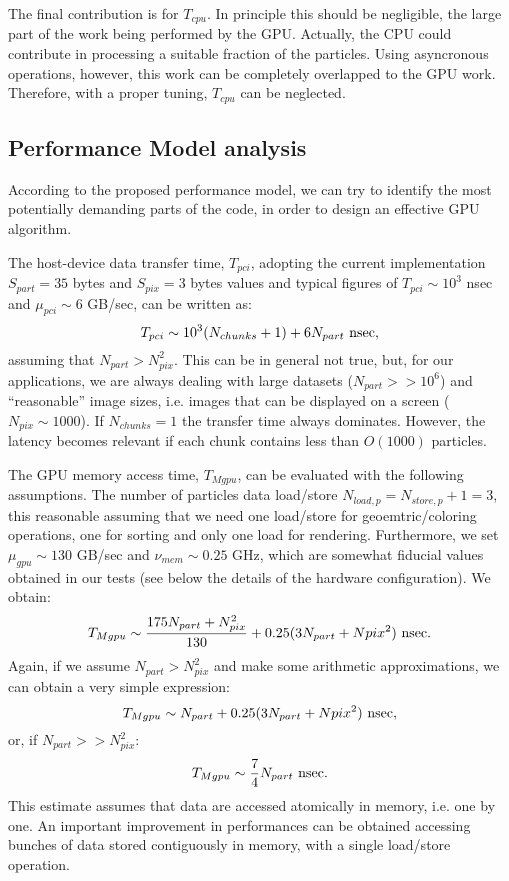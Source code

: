 \documentclass[11pt]{article}
\begin{document}
The final contribution is for $T_{cpu}$. In principle this should be negligible, 
the large part of the work being performed by the GPU. Actually, the CPU
could contribute in processing a suitable fraction of the particles. Using
asyncronous operations, however, this work can be completely overlapped 
to the GPU work. Therefore, with a proper tuning, $T_{cpu}$ can be neglected.

\subsection{Performance Model analysis}

According to the proposed performance model, we can try to identify the most 
potentially demanding parts of the code, in order to design an 
effective GPU algorithm.

The host-device data transfer time, $T_{pci}$, adopting the current implementation 
$S_{part} = 35$ bytes and $S_{pix} = 3$ bytes values and typical figures of 
$T_{pci} \sim 10^3$ nsec and $\mu_{pci} \sim 6$ GB/sec, can be written as:
\begin{equation}
T_{pci} \sim 10^3(N_{chunks} + 1) + 6 N_{part}\ {\rm nsec},
\end{equation}
assuming that $N_{part} > N_{pix}^2$. This can be in general not true, but, 
for our applications, we are always dealing with large datasets
($N_{part} >> 10^6$) and ``reasonable'' image sizes, i.e. images that can be 
displayed on a screen ($N_{pix} \sim 1000$). If $N_{chunks} = 1$ the transfer 
time always dominates. However, the latency becomes relevant if each
chunk contains less than $O(1000)$ particles. 

The GPU memory access time, $T_{Mgpu}$, can be evaluated with the 
following assumptions. The number of particles data load/store $N_{load,p} = 
N_{store,p}+1 = 3$, this reasonable assuming that we need one load/store
for geoemtric/coloring operations, one for sorting and only one load
for rendering. Furthermore, we 
set $\mu_{gpu} \sim 130$ GB/sec and $\nu_{mem} \sim 0.25$ GHz, which are somewhat
fiducial values obtained in our tests (see below the details of the 
hardware configuration). We obtain:
\begin{equation}
T_{Mgpu} \sim {175 N_{part} + N_{pix}^2\over 130} + 0.25 (3 N_{part} + N{pix}^2)\ {\rm nsec}.
\end{equation}
Again, if we assume $N_{part} > N_{pix}^2$ and make some arithmetic approximations,
we can obtain a very simple expression:
\begin{equation}
T_{Mgpu} \sim N_{part} + 0.25 (3 N_{part} + N{pix}^2)\ {\rm nsec},
\end{equation}
or, if $N_{part} >> N_{pix}^2$:
\begin{equation}
T_{Mgpu} \sim {7\over 4} N_{part}\ {\rm nsec}.
\end{equation}
This estimate assumes that data are accessed atomically in memory, i.e. one by one.
An important improvement in performances can be obtained accessing bunches 
of data stored contiguously in memory, with a single load/store operation.
\end{document}
